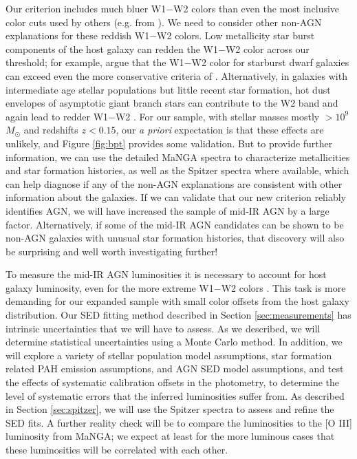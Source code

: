 \documentclass[12pt, preprint]{hacked-aastex}
\begin{document}
 Our criterion
includes much bluer W1$-$W2 colors than even the most inclusive color
cuts used by others (e.g. from \cite{assef18a}).  We need to consider
other non-AGN explanations for these reddish W1$-$W2 colors.  Low
metallicity star burst components of the host galaxy can redden the
W1$-$W2 color across our threshold; for example, \cite{hainline16a}
argue that the W1$-$W2 color for starburst dwarf galaxies can exceed
even the more conservative criteria of \cite{stern12a}.
Alternatively, in galaxies with intermediate age stellar populations
but little recent star formation, hot dust envelopes of asymptotic
giant branch stars can contribute to the W2 band and again lead to
redder W1$-$W2 \cite{villaume15a}. For our sample, with stellar masses
mostly $> 10^9$ $M_\odot$ and redshifts $z<0.15$, our {\it a priori}
expectation is that these effects are unlikely, and Figure
\ref{fig:bpt} provides some validation.
But to provide further information, we can use the detailed MaNGA
spectra to characterize metallicities and star formation histories, as
well as the Spitzer spectra where available, which can help diagnose
if any of the non-AGN explanations are consistent with other
information about the galaxies. If we can validate that our new
criterion reliably identifies AGN, we will have increased the sample
of mid-IR AGN by a large factor. Alternatively, if some of the mid-IR
AGN candidates can be shown to be non-AGN galaxies with unusual star
formation histories, that discovery will also be surprising and well
worth investigating further!

 To measure
the mid-IR AGN luminosities it is necessary to account for host galaxy
luminosity, even for the more extreme W1$-$W2 colors
\cite{lacy15a}. This task is more demanding for our expanded sample
with small color offsets from the host galaxy distribution. Our SED
fitting method described in Section \ref{sec:measurements} has
intrinsic uncertainties that we will have to assess. As we described,
we will determine statistical uncertainties using a Monte Carlo
method.  In addition, we will explore a variety of stellar population
model assumptions, star formation related PAH emission assumptions,
and AGN SED model assumptions, and test the effects of systematic
calibration offsets in the photometry, to determine the level of
systematic errors that the inferred luminosities suffer from. As
described in Section \ref{sec:spitzer}, we will use the Spitzer
spectra to assess and refine the SED fits. A further reality check
will be to compare the luminosities to the [O III] luminosity from
MaNGA; we expect at least for the more luminous cases that these
luminosities will be correlated with each other.
\end{document}
